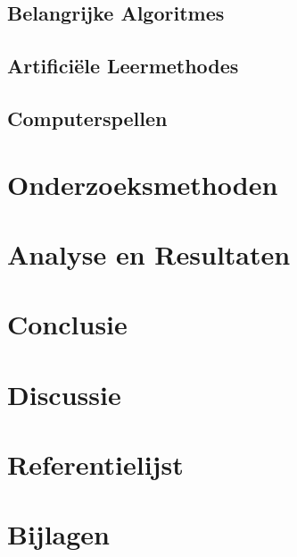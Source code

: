 \documentclass[a4paper,12pt]{report}
\begin{document}
\section{Belangrijke Algoritmes}



\section{Artificiële Leermethodes}

\section{Computerspellen}

\chapter{Onderzoeksmethoden}

\chapter{Analyse en Resultaten}

\chapter{Conclusie}

\chapter{Discussie}

\chapter{Referentielijst}

\chapter{Bijlagen}
\end{document}
